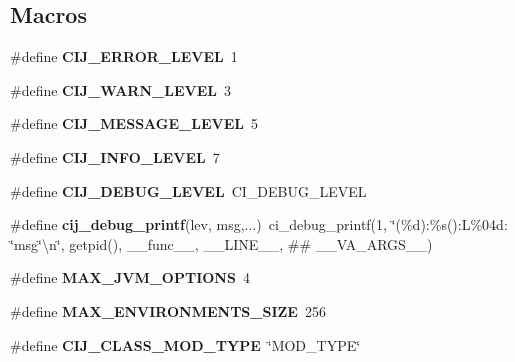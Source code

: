 \subsection*{Macros}
\begin{DoxyCompactItemize}
\item 
\hypertarget{c-icap-java_8c_ab367ee8760db972006b62725295661cd}{\#define {\bfseries C\+I\+J\+\_\+\+E\+R\+R\+O\+R\+\_\+\+L\+E\+V\+E\+L}~1}\label{c-icap-java_8c_ab367ee8760db972006b62725295661cd}

\item 
\hypertarget{c-icap-java_8c_a8ef2d46d7ed8867a30fe802d07e20571}{\#define {\bfseries C\+I\+J\+\_\+\+W\+A\+R\+N\+\_\+\+L\+E\+V\+E\+L}~3}\label{c-icap-java_8c_a8ef2d46d7ed8867a30fe802d07e20571}

\item 
\hypertarget{c-icap-java_8c_af836531b96b53ace27bb64a9a4bd0b11}{\#define {\bfseries C\+I\+J\+\_\+\+M\+E\+S\+S\+A\+G\+E\+\_\+\+L\+E\+V\+E\+L}~5}\label{c-icap-java_8c_af836531b96b53ace27bb64a9a4bd0b11}

\item 
\hypertarget{c-icap-java_8c_a109eedc732646aaff59049f2dbb4ae9c}{\#define {\bfseries C\+I\+J\+\_\+\+I\+N\+F\+O\+\_\+\+L\+E\+V\+E\+L}~7}\label{c-icap-java_8c_a109eedc732646aaff59049f2dbb4ae9c}

\item 
\hypertarget{c-icap-java_8c_a9f05f1bc20d887fd6e78bcb7eb4bd715}{\#define {\bfseries C\+I\+J\+\_\+\+D\+E\+B\+U\+G\+\_\+\+L\+E\+V\+E\+L}~C\+I\+\_\+\+D\+E\+B\+U\+G\+\_\+\+L\+E\+V\+E\+L}\label{c-icap-java_8c_a9f05f1bc20d887fd6e78bcb7eb4bd715}

\item 
\hypertarget{c-icap-java_8c_abcb9f48a8b94e3103fb9c74c57a3ceff}{\#define {\bfseries cij\+\_\+debug\+\_\+printf}(lev, msg,...)~ci\+\_\+debug\+\_\+printf(1, \char`\"{}(\%d)\+:\%s()\+:L\%04d\+: \char`\"{}msg\char`\"{}\textbackslash{}n\char`\"{}, getpid(), \+\_\+\+\_\+func\+\_\+\+\_\+, \+\_\+\+\_\+\+L\+I\+N\+E\+\_\+\+\_\+, \#\# \+\_\+\+\_\+\+V\+A\+\_\+\+A\+R\+G\+S\+\_\+\+\_\+)}\label{c-icap-java_8c_abcb9f48a8b94e3103fb9c74c57a3ceff}

\item 
\hypertarget{c-icap-java_8c_aa0f5d10e300c2541ddf444ce17970eac}{\#define {\bfseries M\+A\+X\+\_\+\+J\+V\+M\+\_\+\+O\+P\+T\+I\+O\+N\+S}~4}\label{c-icap-java_8c_aa0f5d10e300c2541ddf444ce17970eac}

\item 
\hypertarget{c-icap-java_8c_a32edc6d3772795c010edf7dfca20d368}{\#define {\bfseries M\+A\+X\+\_\+\+E\+N\+V\+I\+R\+O\+N\+M\+E\+N\+T\+S\+\_\+\+S\+I\+Z\+E}~256}\label{c-icap-java_8c_a32edc6d3772795c010edf7dfca20d368}

\item 
\hypertarget{c-icap-java_8c_a01981b820f93d8b5cc748cd6d45d065a}{\#define {\bfseries C\+I\+J\+\_\+\+C\+L\+A\+S\+S\+\_\+\+M\+O\+D\+\_\+\+T\+Y\+P\+E}~\char`\"{}M\+O\+D\+\_\+\+T\+Y\+P\+E\char`\"{}}\label{c-icap-java_8c_a01981b820f93d8b5cc748cd6d45d065a}

\end{DoxyCompactItemize}
